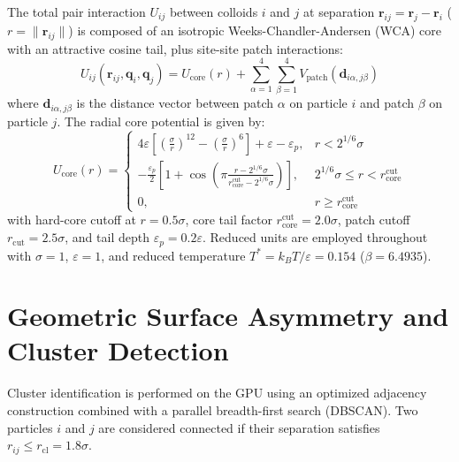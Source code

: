 \documentclass[11pt,a4paper]{article}
\begin{document}
The total pair interaction $U_{ij}$ between colloids $i$ and $j$ at separation $\mathbf{r}_{ij} = \mathbf{r}_j - \mathbf{r}_i$ ($r = \|\mathbf{r}_{ij}\|$) is composed of an isotropic Weeks-Chandler-Andersen (WCA) core with an attractive cosine tail, plus site-site patch interactions:
\begin{equation}
U_{ij}(\mathbf{r}_{ij}, \mathbf{q}_i, \mathbf{q}_j) = U_{\text{core}}(r) + \sum_{\alpha=1}^4 \sum_{\beta=1}^4 V_{\text{patch}}(\mathbf{d}_{i\alpha, j\beta})
\end{equation}
where $\mathbf{d}_{i\alpha, j\beta}$ is the distance vector between patch $\alpha$ on particle $i$ and patch $\beta$ on particle $j$. The radial core potential is given by:
\begin{equation}
U_{\text{core}}(r) = 
\begin{cases}
4\varepsilon \left[ \left(\frac{\sigma}{r}\right)^{12} - \left(\frac{\sigma}{r}\right)^6 \right] + \varepsilon - \varepsilon_p, & r < 2^{1/6}\sigma \\
-\frac{\varepsilon_p}{2} \left[ 1 + \cos\left( \pi \frac{r - 2^{1/6}\sigma}{r_{\text{core}}^{\text{cut}} - 2^{1/6}\sigma} \right) \right], & 2^{1/6}\sigma \le r < r_{\text{core}}^{\text{cut}} \\
0, & r \ge r_{\text{core}}^{\text{cut}}
\end{cases}
\end{equation}
with hard-core cutoff at $r = 0.5\sigma$, core tail factor $r_{\text{core}}^{\text{cut}} = 2.0\sigma$, patch cutoff $r_{\text{cut}} = 2.5\sigma$, and tail depth $\varepsilon_p = 0.2\varepsilon$. Reduced units are employed throughout with $\sigma = 1$, $\varepsilon = 1$, and reduced temperature $T^* = k_B T / \varepsilon = 0.154$ ($\beta = 6.4935$).

\section{Geometric Surface Asymmetry and Cluster Detection}
Cluster identification is performed on the GPU using an optimized adjacency construction combined with a parallel breadth-first search (DBSCAN). Two particles $i$ and $j$ are considered connected if their separation satisfies $r_{ij} \le r_{\text{cl}} = 1.8\sigma$.
\end{document}
